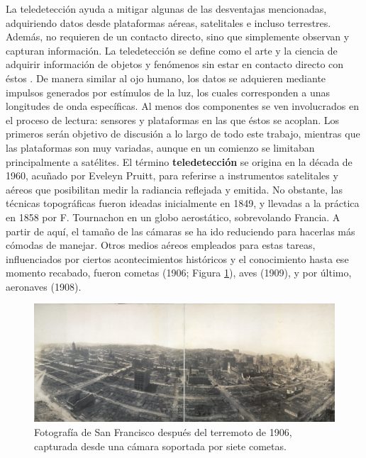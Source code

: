 La teledetección ayuda a mitigar algunas de las desventajas mencionadas, adquiriendo datos desde plataformas aéreas, satelitales e incluso terrestres. Además, no requieren de un contacto directo, sino que simplemente observan y capturan información. La teledetección se define como el arte y la ciencia de adquirir información de objetos y fenómenos sin estar en contacto directo con éstos \cite{lillesand_remote_2015}. De manera similar al ojo humano, los datos se adquieren mediante impulsos generados por estímulos de la luz, los cuales corresponden a unas longitudes de onda específicas. Al menos dos componentes se ven involucrados en el proceso de lectura: sensores y plataformas en las que éstos se acoplan. Los primeros serán objetivo de discusión a lo largo de todo este trabajo, mientras que las plataformas son muy variadas, aunque en un comienzo se limitaban principalmente a satélites. El término \textbf{teledetección} se origina en la década de 1960, acuñado por Eveleyn Pruitt, para referirse a instrumentos satelitales y aéreos que posibilitan medir la radiancia reflejada y emitida. No obstante, las técnicas topográficas fueron ideadas inicialmente en 1849, y llevadas a la práctica en 1858 por F. Tournachon en un globo aerostático, sobrevolando Francia. A partir de aquí, el tamaño de las cámaras se ha ido reduciendo para hacerlas más cómodas de manejar. Otros medios aéreos empleados para estas tareas, influenciados por ciertos acontecimientos históricos y el conocimiento hasta ese momento recabado, fueron cometas (1906; Figura \ref{fig:san_francisco_kite_spanish}), aves (1909), y por último, aeronaves (1908). 

\begin{figure}[!ht]
	\includegraphics[width=0.95\linewidth]{figs/introduction/san_francisco_kitecamera.jpg}
	\caption{Fotografía de San Francisco después del terremoto de 1906, capturada desde una cámara soportada por siete cometas. }
    \label{fig:san_francisco_kite_spanish}
\end{figure}

